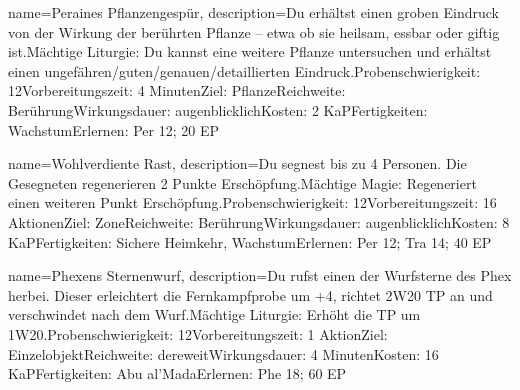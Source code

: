 {
    name={Peraines Pflanzengespür},
    description={Du erhältst einen groben Eindruck von der Wirkung der berührten Pflanze – etwa ob sie heilsam, essbar oder giftig ist.\newline Mächtige Liturgie: Du kannst eine weitere Pflanze untersuchen und erhältst einen ungefähren/guten/genauen/detaillierten Eindruck.\newline Probenschwierigkeit: 12\newline Vorbereitungszeit: 4 Minuten\newline Ziel: Pflanze\newline Reichweite: Berührung\newline Wirkungsdauer: augenblicklich\newline Kosten: 2 KaP\newline Fertigkeiten: Wachstum\newline Erlernen: Per 12; 20 EP}
}


{
    name={Wohlverdiente Rast},
    description={Du segnest bis zu 4 Personen. Die Gesegneten regenerieren 2 Punkte Erschöpfung.\newline Mächtige Magie: Regeneriert einen weiteren Punkt Erschöpfung.\newline Probenschwierigkeit: 12\newline Vorbereitungszeit: 16 Aktionen\newline Ziel: Zone\newline Reichweite: Berührung\newline Wirkungsdauer: augenblicklich\newline Kosten: 8 KaP\newline Fertigkeiten: Sichere Heimkehr, Wachstum\newline Erlernen: Per 12; Tra 14; 40 EP}
}


{
    name={Phexens Sternenwurf},
    description={Du rufst einen der Wurfsterne des Phex herbei. Dieser erleichtert die Fernkampfprobe um +4, richtet 2W20 TP an und verschwindet nach dem Wurf.\newline Mächtige Liturgie: Erhöht die TP um 1W20.\newline Probenschwierigkeit: 12\newline Vorbereitungszeit: 1 Aktion\newline Ziel: Einzelobjekt\newline Reichweite: dereweit\newline Wirkungsdauer: 4 Minuten\newline Kosten: 16 KaP\newline Fertigkeiten: Abu al'Mada\newline Erlernen: Phe 18; 60 EP}
}


